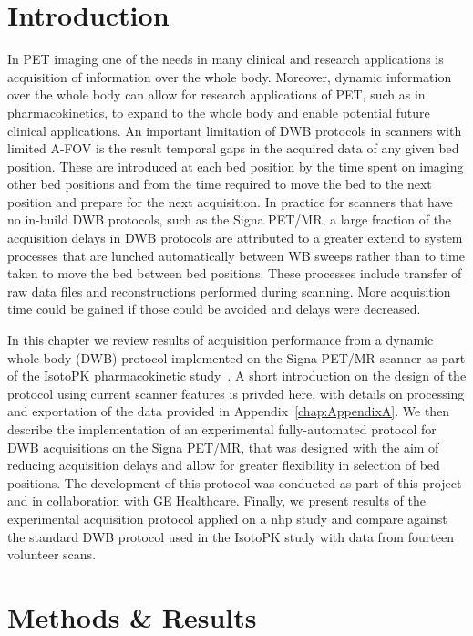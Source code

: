 \section{Introduction}
In PET imaging one of the needs in many clinical and research applications is acquisition of information over the whole body. Moreover, dynamic information over the whole body can allow for research applications of PET, such as in pharmacokinetics, to expand to the whole body and enable potential future clinical applications. 
An important limitation of DWB protocols in scanners with limited A-FOV is the result temporal gaps in the acquired data of any given bed position. These are introduced at each bed position by the time spent on imaging other bed positions and from the time required to move the bed to the next position and prepare for the next acquisition. 
In practice for scanners that have no in-build DWB protocols, such as the Signa PET/MR, a large fraction of the acquisition delays in DWB protocols are attributed to a greater extend to system processes that are lunched automatically between WB sweeps rather than to time taken to move the bed between bed positions. These processes include transfer of raw data files and reconstructions performed during scanning. More acquisition time could be gained if those could be avoided and delays were decreased.

In this chapter we review results of acquisition performance from a dynamic whole-body (DWB) protocol implemented on the Signa PET/MR scanner as part of the IsotoPK pharmacokinetic study~\cite{Marie2019}. A short introduction on the design of the protocol using current scanner features is privded here, with details on processing and exportation of the data provided in Appendix~\ref{chap:AppendixA}.
We then describe the implementation of an experimental fully-automated protocol for DWB acquisitions on the Signa PET/MR, that was designed with the aim of reducing acquisition delays and allow for greater flexibility in selection of bed positions. The development of this protocol was conducted as part of this project and in collaboration with GE Healthcare. 
Finally, we present results of the experimental acquisition protocol applied on a \gls{nhp} study and compare against the standard DWB protocol used in the IsotoPK study with data from fourteen volunteer scans.

\section{Methods \& Results}

